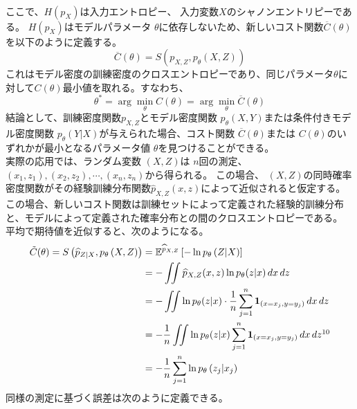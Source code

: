 \documentclass[a4paper]{jsarticle}%
\begin{document}
\, \\
ここで、$ H \left(p_X\right) $は入力エントロピー、 \ie 入力変数$X$のシャノンエントリピーである。 $ H \left(p_X\right) $はモデルパラメータ $ \theta $に依存しないため、新しいコスト関数$\overline{C}(\theta)$を以下のように定義する。
$$ \overline{C}(\theta) = S(p_{X,Z}, p_\theta(X,Z)) $$
これはモデル密度の訓練密度のクロスエントロピーであり、同じパラメータ$\theta$に対して$C \left(\theta\right)$最小値を取れる。すなわち、
\begin{equation*}
  \theta^* = \arg\min_{\theta} C \left(\theta\right) = \arg\min_{\theta} \overline{C}(\theta)
\end{equation*}
結論として、訓練密度関数$p_{X,Z}$とモデル密度関数 $ p_{\theta} \left(X,Y\right) $または条件付きモデル密度関数 $ p_{\theta} \left(Y|X\right) $が与えられた場合、コスト関数 $ \overline{C} \left(\theta\right) $または $ C \left(\theta\right) $のいずれかが最小となるパラメータ値 $ \theta $を見つけることができる。\\
実際の応用では、ランダム変数 $ \left(X,Z\right) $は $ n $回の測定、 $ \left(x_1,z_1\right), \left(x_2,z_2\right),\cdots , \left(x_n,z_n\right) $から得られる。
この場合、 $ \left(X,Z\right) $の同時確率密度関数がその経験訓練分布関数\footnotemark[9] $ \widehat{p}_{X,Z} \left(x,z\right) $によって近似されると仮定する。この場合、新しいコスト関数は訓練セットによって定義された経験的訓練分布と、モデルによって定義された確率分布との間のクロスエントロピーである。
平均で期待値を近似すると、次のようになる。
\begin{align}
  \tilde{C}(\theta) = S \left(\widehat{p}_{Z|X}, p_\theta \left(X,Z\right)\right) &= \mathbb{E}^{\widehat{p}_{X,Z}} \left[-\ln p_\theta \left(Z|X\right)\right]\notag\\
  &= -\iint \widehat{p}_{X,Z}(x,z)\ln p_{\theta}(z|x)\, dx\, dz\notag\\
  &= -\iint \ln p_{\theta}(z|x)\cdot \dfrac{1}{n}\sum_{j=1}^{n} \mathbf{1}_{\left(x=x_j,y=y_j\right)}\, dx\, dz\notag\\
  &= -\dfrac{1}{n}\iint \ln p_{\theta}(z|x)\sum_{j=1}^{n} \mathbf{1}_{\left(x=x_j,y=y_j\right)}\, dx\, dz\footnotemark[10]\notag\\
  &= -\dfrac{1}{n}\sum_{j=1}^{n} \ln p_\theta \left(z_j|x_j\right) \notag
\end{align}
同様の測定に基づく誤差は次のように定義できる。
\end{document}
